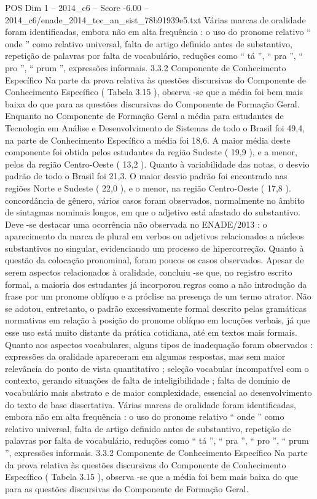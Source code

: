 \begin{textsample}{POS Dim 1 – 2014\_c6 – Score -6.00 – 2014\_c6/enade\_2014\_tec\_an\_sist\_78b91939e5.txt}
Várias marcas de oralidade foram identificadas, embora não em alta frequência : o uso do pronome relativo “ onde ” como relativo universal, falta de artigo definido antes de substantivo, repetição de palavras por falta de vocabulário, reduções como “ tá ”, “ pra ”, “ pro ”, “ prum ”, expressões informais. 3.3.2 Componente de Conhecimento Específico Na parte da prova relativa às questões discursivas do Componente de Conhecimento Específico ( Tabela 3.15 ), observa -se que a média foi bem mais baixa do que para as questões discursivas do Componente de Formação Geral.
Enquanto no Componente de Formação Geral a média para estudantes de Tecnologia em Análise e Desenvolvimento de Sistemas de todo o Brasil foi 49,4, na parte de Conhecimento Específico a média foi 18,6.
A maior média deste componente foi obtida pelos estudantes da região Sudeste ( 19,9 ), e a menor, pelos da região Centro-Oeste ( 13,2 ).
Quanto à variabilidade das notas, o desvio padrão de todo o Brasil foi 21,3.
O maior desvio padrão foi encontrado nas regiões Norte e Sudeste ( 22,0 ), e o menor, na região Centro-Oeste ( 17,8 ). concordância de gênero, vários casos foram observados, normalmente no âmbito de sintagmas nominais longos, em que o adjetivo está afastado do substantivo.
Deve -se destacar uma ocorrência não observada no ENADE/2013 : o aparecimento da marca de plural em verbos ou adjetivos relacionados a núcleos substantivos no singular, evidenciando um processo de hipercorreção.
Quanto à questão da colocação pronominal, foram poucos os casos observados.
Apesar de serem aspectos relacionados à oralidade, concluiu -se que, no registro escrito formal, a maioria dos estudantes já incorporou regras como a não introdução da frase por um pronome oblíquo e a próclise na presença de um termo atrator.
Não se adotou, entretanto, o padrão excessivamente formal descrito pelas gramáticas normativas em relação à posição do pronome oblíquo em locuções verbais, já que esse uso está muito distante da prática cotidiana, até em textos mais formais.
Quanto aos aspectos vocabulares, alguns tipos de inadequação foram observados : expressões da oralidade apareceram em algumas respostas, mas sem maior relevância do ponto de vista quantitativo ; seleção vocabular incompatível com o contexto, gerando situações de falta de inteligibilidade ; falta de domínio de vocabulário mais abstrato e de maior complexidade, essencial ao desenvolvimento do texto de base dissertativa.
Várias marcas de oralidade foram identificadas, embora não em alta frequência : o uso do pronome relativo “ onde ” como relativo universal, falta de artigo definido antes de substantivo, repetição de palavras por falta de vocabulário, reduções como “ tá ”, “ pra ”, “ pro ”, “ prum ”, expressões informais. 3.3.2 Componente de Conhecimento Específico Na parte da prova relativa às questões discursivas do Componente de Conhecimento Específico ( Tabela 3.15 ), observa -se que a média foi bem mais baixa do que para as questões discursivas do Componente de Formação Geral.

\end{textsample}
